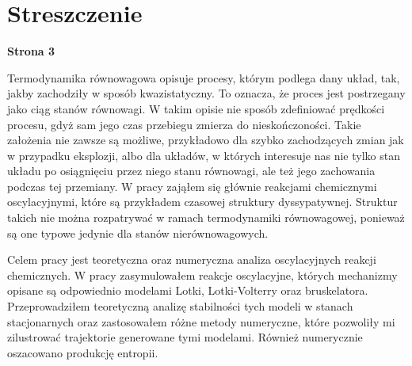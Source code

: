 \documentclass[10pt, a4paper, twoside, onecolumn]{article}
\numberwithin{equation}{section}
\begin{document}
	\section*{Streszczenie}
	\begin{center}
		\textbf{Strona 3}
	\end{center}
	Termodynamika równowagowa opisuje procesy, którym podlega dany układ, tak, jakby zachodziły w sposób kwazistatyczny. To oznacza, że proces jest postrzegany jako ciąg stanów równowagi. W takim opisie nie sposób zdefiniować prędkości procesu, gdyż sam jego czas przebiegu zmierza do nieskończoności. Takie założenia nie zawsze są możliwe, przykładowo dla szybko zachodzących zmian jak w przypadku eksplozji, albo dla układów, w których interesuje nas nie tylko stan układu po osiągnięciu przez niego stanu równowagi, ale też jego zachowania podczas tej przemiany. W pracy zająłem się głównie reakcjami chemicznymi oscylacyjnymi, które są przykładem czasowej struktury dyssypatywnej. Struktur takich nie można rozpatrywać w ramach termodynamiki równowagowej, ponieważ są one typowe jedynie dla stanów nierównowagowych. \par
	Celem pracy jest teoretyczna oraz numeryczna analiza oscylacyjnych reakcji chemicznych. W pracy zasymulowałem reakcje oscylacyjne, których mechanizmy opisane są odpowiednio modelami Lotki, Lotki-Volterry oraz bruskelatora. Przeprowadziłem teoretyczną analizę stabilności tych modeli w stanach stacjonarnych oraz zastosowałem różne metody numeryczne, które pozwoliły mi zilustrować trajektorie generowane tymi modelami. Również numerycznie oszacowano produkcję entropii. 
	
	
\end{document}
